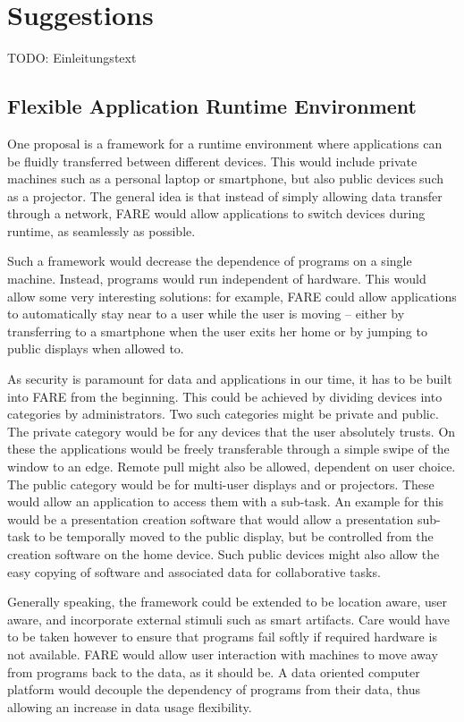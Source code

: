 \section{Suggestions}

TODO: Einleitungstext

\subsection{Flexible Application Runtime Environment}

One proposal is a framework for a runtime environment where applications can be fluidly transferred between different devices.
This would include private machines such as a personal laptop or smartphone, but also public devices such as a projector.
The general idea is that instead of simply allowing data transfer through a network, FARE would allow applications to switch devices during runtime, as seamlessly as possible.

Such a framework would decrease the dependence of programs on a single machine.
Instead, programs would run independent of hardware.
This would allow some very interesting solutions: for example, FARE could allow applications to automatically stay near to a user while the user is moving – either by transferring to a smartphone when the user exits her home or by jumping to public displays when allowed to.

As security is paramount for data and applications in our time, it has to be built into FARE from the beginning.
This could be achieved by dividing devices into categories by administrators.
Two such categories might be private and public.
The private category would be for any devices that the user absolutely trusts.
On these the applications would be freely transferable through a simple swipe of the window to an edge.
Remote pull might also be allowed, dependent on user choice.
The public category would be for multi-user displays and or projectors.
These would allow an application to access them with a sub-task.
An example for this would be a presentation creation software that would allow a presentation sub-task to be temporally moved to the public display, but be controlled from the creation software on the home device.
Such public devices might also allow the easy copying of software and associated data for collaborative tasks.

Generally speaking, the framework could be extended to be location aware, user aware, and incorporate external stimuli such as smart artifacts.
Care would have to be taken however to ensure that programs fail softly if required hardware is not available.
FARE would allow user interaction with machines to move away from programs back to the data, as it should be.
A data oriented computer platform would decouple the dependency of programs from their data, thus allowing an increase in data usage flexibility.

